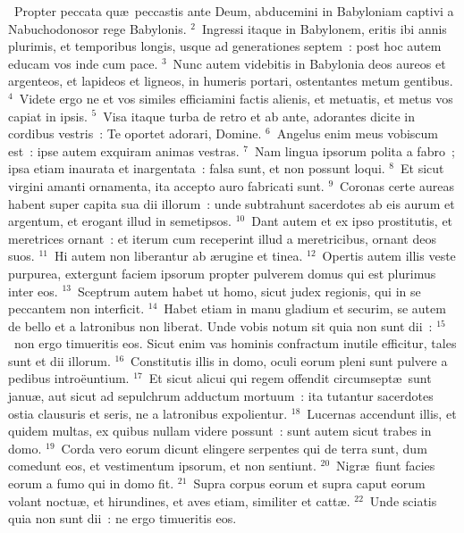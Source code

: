 ~Propter peccata qu\ae\ peccastis ante Deum, abducemini in Babyloniam captivi a Nabuchodonosor rege Babylonis.
${}^{2}$~Ingressi itaque in Babylonem, eritis ibi annis plurimis, et temporibus longis, usque ad generationes septem~: post hoc autem educam vos inde cum pace.
${}^{3}$~Nunc autem videbitis in Babylonia deos aureos et argenteos, et lapideos et ligneos, in humeris portari, ostentantes metum gentibus.
${}^{4}$~Videte ergo ne et vos similes efficiamini factis alienis, et metuatis, et metus vos capiat in ipsis.
${}^{5}$~Visa itaque turba de retro et ab ante, adorantes dicite in cordibus vestris~: Te oportet adorari, Domine.
${}^{6}$~Angelus enim meus vobiscum est~: ipse autem exquiram animas vestras.
${}^{7}$~Nam lingua ipsorum polita a fabro~; ipsa etiam inaurata et inargentata~: falsa sunt, et non possunt loqui.
${}^{8}$~Et sicut virgini amanti ornamenta, ita accepto auro fabricati sunt.
${}^{9}$~Coronas certe aureas habent super capita sua dii illorum~: unde subtrahunt sacerdotes ab eis aurum et argentum, et erogant illud in semetipsos.
${}^{10}$~Dant autem et ex ipso prostitutis, et meretrices ornant~: et iterum cum receperint illud a meretricibus, ornant deos suos.
${}^{11}$~Hi autem non liberantur ab \ae rugine et tinea.
${}^{12}$~Opertis autem illis veste purpurea, extergunt faciem ipsorum propter pulverem domus qui est plurimus inter eos.
${}^{13}$~Sceptrum autem habet ut homo, sicut judex regionis, qui in se peccantem non interficit.
${}^{14}$~Habet etiam in manu gladium et securim, se autem de bello et a latronibus non liberat. Unde vobis notum sit quia non sunt dii~:
${}^{15}$~non ergo timueritis eos. Sicut enim vas hominis confractum inutile efficitur, tales sunt et dii illorum.
${}^{16}$~Constitutis illis in domo, oculi eorum pleni sunt pulvere a pedibus intro\"euntium.
${}^{17}$~Et sicut alicui qui regem offendit circumsept\ae\ sunt janu\ae , aut sicut ad sepulchrum adductum mortuum~: ita tutantur sacerdotes ostia clausuris et seris, ne a latronibus expolientur.
${}^{18}$~Lucernas accendunt illis, et quidem multas, ex quibus nullam videre possunt~: sunt autem sicut trabes in domo.
${}^{19}$~Corda vero eorum dicunt elingere serpentes qui de terra sunt, dum comedunt eos, et vestimentum ipsorum, et non sentiunt.
${}^{20}$~Nigr\ae\ fiunt facies eorum a fumo qui in domo fit.
${}^{21}$~Supra corpus eorum et supra caput eorum volant noctu\ae , et hirundines, et aves etiam, similiter et catt\ae .
${}^{22}$~Unde sciatis quia non sunt dii~: ne ergo timueritis eos.



